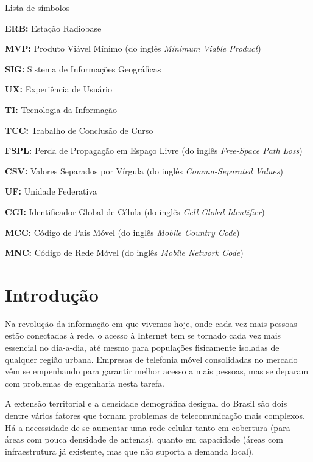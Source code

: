 \documentclass[]{politex}
\begin{document}
\begin{pretextualsection}{Lista de símbolos}

\textbf{ERB:} Estação Radiobase

\textbf{MVP:} Produto Viável Mínimo (do inglês \textit{Minimum Viable Product})

\textbf{SIG:} Sistema de Informações Geográficas

\textbf{UX:} Experiência de Usuário

\textbf{TI:} Tecnologia da Informação

\textbf{TCC:} Trabalho de Conclusão de Curso

\textbf{FSPL:} Perda de Propagação em Espaço Livre (do inglês \textit{Free-Space Path Loss})

\textbf{CSV:} Valores Separados por Vírgula (do inglês \textit{Comma-Separated Values})

\textbf{UF:} Unidade Federativa

\textbf{CGI:} Identificador Global de Célula (do inglês \textit{Cell Global Identifier})

\textbf{MCC:} Código de País Móvel (do inglês \textit{Mobile Country Code})

\textbf{MNC:} Código de Rede Móvel (do inglês \textit{Mobile Network Code})

\end{pretextualsection}

\sumario




\chapter{Introdução}

Na revolução da informação em que vivemos hoje, onde cada vez mais pessoas estão
conectadas à rede, o acesso à Internet tem se tornado cada vez mais essencial no
dia-a-dia, até mesmo para populações fisicamente isoladas de qualquer região
urbana. Empresas de telefonia móvel consolidadas no mercado vêm se empenhando
para garantir melhor acesso a mais pessoas, mas se deparam com problemas de
engenharia nesta tarefa.

A extensão territorial e a densidade demográfica desigual do Brasil são dois
dentre vários fatores que tornam problemas de telecomunicação mais complexos. Há
a necessidade de se aumentar uma rede celular tanto em cobertura (para áreas com
pouca densidade de antenas), quanto em capacidade (áreas com infraestrutura já
existente, mas que não suporta a demanda local).
\end{document}
